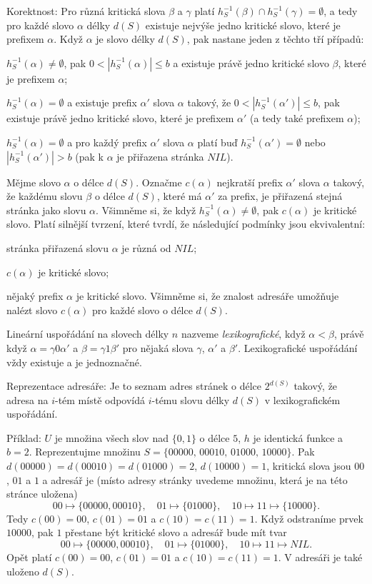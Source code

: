 \documentclass[a4paper,12pt]{article}
\begin{document}
Korektnost: Pro různá kritická slova 
$\beta$ a $\gamma$ platí $h^{-1}_S(\beta )\cap h^{-1}_S(\gamma 
)=\emptyset$, a tedy pro každé slovo $\alpha$ 
délky $d(S)$ existuje nejvýše jedno kritické slovo, které 
je prefixem $\alpha$. Když $\alpha$ je slovo délky $d(S)$, pak nastane 
jeden z těchto tří případů:
\roster
\item
$h^{-1}_S(\alpha )\ne\emptyset$, pak $0<|h^{-1}_S(\alpha )|\le b$ a existuje právě jedno kritické slovo $
\beta$, 
které je prefixem $\alpha$; 
\item
$h^{-1}_S(\alpha )=\emptyset$ a existuje prefix $\alpha'$ slova $
\alpha$ takový, že 
$0<|h^{-1}_S(\alpha')|\le b$, pak existuje právě jedno kritické slovo, které je 
prefixem $\alpha'$ (a tedy také prefixem $\alpha$);
\item
$h^{-1}_S(\alpha )=\emptyset$ a pro každý prefix $\alpha'$ slova $
\alpha$ platí buď 
$h^{-1}_S(\alpha')=\emptyset$ nebo $|h^{-1}_S(\alpha')|>b$ (pak k $
\alpha$ je přiřazena 
stránka $NIL$).
\endroster

Mějme slovo $\alpha$ o délce $d(S)$. Označme $c
(\alpha )$ nejkratší 
prefix $\alpha'$ slova $\alpha$ takový, že každému slovu $\beta$ o délce $d(S)$, které má $\alpha'$ 
za prefix, je přiřazená stejná stránka jako slovu $\alpha$. Všimněme si, že když $h^{
-1}_S(\alpha )\ne\emptyset$, pak $c(\alpha )$ je 
kritické slovo. Platí silnější tvrzení, které tvrdí, že 
následující podmínky jsou ekvivalentní:
\roster
\item
stránka přiřazená slovu $\alpha$ je různá od $
NIL$;
\item
$c(\alpha )$ je kritické slovo;
\item
nějaký prefix $\alpha$ je kritické slovo.
\endroster
Všimněme si, že znalost adresáře umožňuje nalézt slovo 
$c(\alpha )$ pro každé slovo o délce $d(S)$.

Lineární uspořádání na slovech délky $
n$ nazveme 
\emph{lexikografické}, když $\alpha <\beta$, právě když 
$\alpha =\gamma 0\alpha'$ a $\beta =\gamma 1\beta'$ pro nějaká slova $
\gamma$, $\alpha'$ a $\beta'$. 
Lexikografické uspořádání vždy existuje a je 
jednoznačné.

Reprezentace adresáře: Je to seznam adres 
stránek o délce $2^{d(S)}$ takový, že adresa na $i$-tém místě 
odpovídá $i$-tému slovu délky $d(S)$ v lexikografickém 
uspořádání.

Příklad: $U$ je množina všech slov nad $\{
0,1\}$ o 
délce $5$, $h$ 
je identická funkce a $b=2$. Reprezentujme množinu  
$S=\{00000,\,00010,\,01000,\,10000\}$. Pak 
$d(00000)=d(00010)=d(01000)=2$, $d(10000)=1$, kritická slova 
jsou $00$, $01$ a $1$ a adresář je (místo adresy stránky 
uvedeme množinu, která je na této stránce uložena)
$$00\mapsto \{00000,00010\},\quad 01\mapsto \{01000\},\quad 10\mapsto 
11\mapsto \{10000\}.$$
Tedy $c(00)=00$, $c(01)=01$ a $c(10)=c(11)=1$.
Když odstraníme prvek $10000$, pak $1$ přestane být kritické 
slovo a adresář bude mít tvar
$$00\mapsto \{00000,00010\},\quad 01\mapsto \{01000\},\quad 10\mapsto 
11\mapsto NIL.$$
Opět platí $c(00)=00$, $c(01)=01$ a $c(10)=c(11)=1$.
V adresáři je také uloženo $d(S)$.
\end{document}
